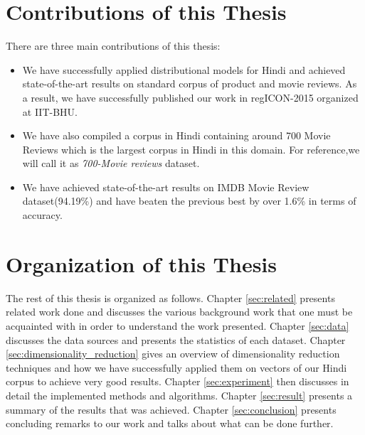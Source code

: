\section{Contributions of this Thesis}
There are three main contributions of this thesis:
\begin{itemize}
\item We have successfully applied distributional models for Hindi and achieved state-of-the-art results on standard corpus of product and movie reviews. As a result, we have successfully published our work in regICON-2015 organized at IIT-BHU.
\item We have also compiled a corpus in Hindi containing around 700 Movie Reviews which is the largest corpus in Hindi in this domain. For reference,we will call it as \emph{700-Movie reviews} dataset.
\item We have achieved state-of-the-art results on IMDB Movie Review dataset(94.19\%) and have beaten the previous best by over 1.6\% in terms of accuracy.
\end{itemize}

\section{Organization of this Thesis}
The rest of this thesis is organized as follows. Chapter \ref{sec:related} presents related work done and discusses the various background work that one must be acquainted with in order to understand the work presented. Chapter \ref{sec:data} discusses the data sources and presents the statistics of each dataset. Chapter \ref{sec:dimensionality_reduction} gives an overview of dimensionality reduction techniques and how we have successfully applied them on vectors of our Hindi corpus to achieve very good results. Chapter \ref{sec:experiment} then discusses in detail the implemented methods and algorithms. Chapter \ref{sec:result} presents a summary of the results that was achieved. Chapter \ref{sec:conclusion} presents concluding remarks to our work and talks about what can be done further.
